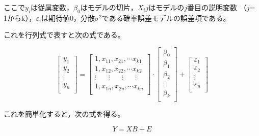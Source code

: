 \documentclass[12pt]{jarticle}
\begin{document}
{ここで$y_i$は従属変数，$\beta_0$はモデルの切片，$X_ij$はモデルの$j$番目の説明変数 （$j$= 1からk），$\varepsilon_i$は期待値0，分散$\sigma^2$である確率誤差モデルの誤差項である。

これを行列式で表すと次の式である。

\begin{equation}
  \label{eq5}
  \left[
    \begin{array} {c}
      y_1    \\
      y_2    \\
      \vdots \\
      y_n    \\
    \end{array}
    \right]
  =
  \left[
    \begin{array} {c}
      1,x_{11},x_{21},\cdots x_{k1}                                         \\
      1,x_{12},x_{22},\cdots x_{k2}                                         \\
      \vdots \hspace{20pt} \vdots \hspace{20pt} \vdots \hspace{20pt} \vdots \\
      1,x_{1n},x_{2n},\cdots x_{kn}                                         \\
    \end{array}
    \right]
  \cdot
  \left[
    \begin{array} {c}
      \beta_0 \\
      \beta_1 \\
      \beta_2 \\
      \vdots  \\
      \beta_k \\
    \end{array}
    \right]
  +
  \left[
    \begin{array} {c}
      \varepsilon_1 \\
      \varepsilon_2 \\
      \vdots        \\
      \varepsilon_n \\
    \end{array}
    \right]
\end{equation}

これを簡単化すると，次の式を得る。

\begin{equation}
  \label{eq6}
  Y = X B + E
\end{equation}

}
\end{document}
